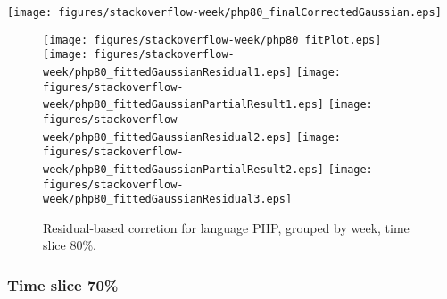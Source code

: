 \begin{center}
{\texttt{[image: figures/stackoverflow-week/php80\_finalCorrectedGaussian.eps]}}
\end{center}

\FloatBarrier

\begin{figure}[t]
\centering
{}
{\texttt{[image: figures/stackoverflow-week/php80\_fitPlot.eps]}}
{\texttt{[image: figures/stackoverflow-week/php80\_fittedGaussianResidual1.eps]}}
{\texttt{[image: figures/stackoverflow-week/php80\_fittedGaussianPartialResult1.eps]}}
{\texttt{[image: figures/stackoverflow-week/php80\_fittedGaussianResidual2.eps]}}
{\texttt{[image: figures/stackoverflow-week/php80\_fittedGaussianPartialResult2.eps]}}
{\texttt{[image: figures/stackoverflow-week/php80\_fittedGaussianResidual3.eps]}}
\caption{Residual-based corretion for language PHP, grouped by week, time slice 80\%.}
\end{figure}


\FloatBarrier


\subsubsection{Time slice 70\%}

